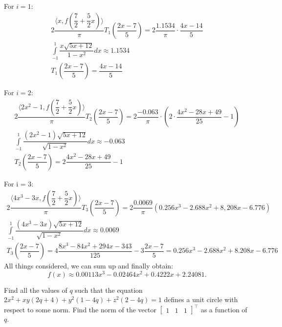\documentclass[12pt]{report}
\begin{document}
\begin{solution}
\[    \]
    \par 
    For $i = 1$:
    \[
      \begin{array}{c}
         \displaystyle 2\dfrac{\big\langle x, f\left(\dfrac{7}{2} + \dfrac{5}{2}x\right) \big\rangle}{\pi} T_1\left(\dfrac{2x-7}{5}\right) = 2\dfrac{1.1534}{\pi}\cdot \dfrac{4x-14}{5} \\[1cm]
         \displaystyle \int\limits_{-1}^1 \dfrac{x\sqrt{5x+12}}{1-x^2} dx \approx 1.1534 \\
         T_1\left(\dfrac{2x-7}{5}\right) = \dfrac{4x-14}{5}
      \end{array}
    \]
    \par 
    For $i = 2$:
    \[
         \begin{array}{c}
            \displaystyle 2 \dfrac{\big\langle 2x^2-1, f\left(\dfrac{7}{2} + \dfrac{5}{2}x\right) \big\rangle}{\pi} T_2\left(\dfrac{2x-7}{5}\right) = 2 \dfrac{-0.063}{\pi} \cdot\left(2 \cdot \dfrac{4x^2 - 28x + 49}{25} - 1\right)  \\[1cm]
            \displaystyle \int\limits_{-1}^1 \dfrac{(2x^2 - 1)\sqrt{5x+12}}{\sqrt{1-x^2}} dx \approx -0.063 \\
            T_2\left(\dfrac{2x-7}{5}\right) = 2\dfrac{4x^2 - 28x + 49}{25} - 1
         \end{array}
    \]
    \par 
    For i = 3:
    \[
         \begin{array}{c}
            \displaystyle 2\dfrac{\big\langle 4x^3 - 3x, f\left(\dfrac{7}{2} + \dfrac{5}{2}x\right) \big\rangle}{\pi} T_3\left(\dfrac{2x-7}{5}\right) = 2 \dfrac{0.0069}{\pi} \left(0.256x^3 - 2.688x^2 + 8,208x - 6.776\right)  \\[1cm]
            \displaystyle \int\limits_{-1}^{1} \dfrac{(4x^3 - 3x)\sqrt{5x+12}}{\sqrt{1-x^2}} dx \approx 0.0069 \\
            T_3\left(\dfrac{2x-7}{5}\right) = 4\dfrac{8x^3 - 84x^2 + 294x - 343}{125} - 3 \dfrac{2x-7}{5} = 0.256x^3 - 2.688x^2 + 8.208x - 6.776
         \end{array}
    \]
    All things considered, we can sum up and finally obtain:
    \[
      f(x) \approx 0.00113 x^3 - 0.02464 x^2 + 0.4222x + 2.24081.
    \]
    \begin{figure}[H]
      
    \end{figure}
\end{solution}

\begin{problem}{}
    Find all the values of $q$ such that the equation $2x^2 + xy(2q+4) + y^2(1-4q) + z^2(2-4q) = 1$ defines a unit circle with respect to some norm. Find the norm of the vector $\begin{bmatrix}
      1 & 1 & 1
    \end{bmatrix}^\intercal$ as a function of $q$.
\end{problem}
\end{document}
